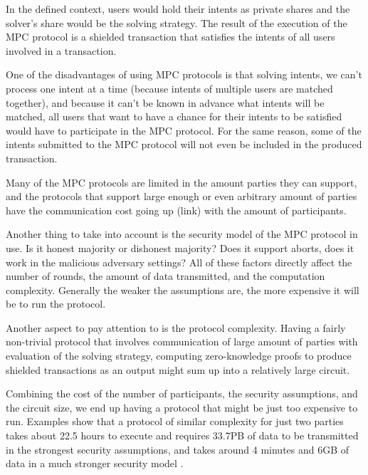 \documentclass[
    9pt,            %
    report,        %
    affiltop,       %
]{art}
\begin{document}
In the defined context, users would hold their intents as private shares and the solver's share would be the solving strategy. The result of the execution of the MPC protocol is a shielded transaction that satisfies the intents of all users involved in a transaction.

\hfill

One of the disadvantages of using MPC protocols is that solving intents, we can't process one intent at a time (because intents of multiple users are matched together), and because it can't be known in advance what intents will be matched, all users that want to have a chance for their intents to be satisfied would have to participate in the MPC protocol. For the same reason, some of the intents submitted to the MPC protocol will not even be included in the produced transaction.

Many of the MPC protocols are limited in the amount parties they can support, and the protocols that support large enough or even arbitrary amount of parties have the communication cost going up (link) with the amount of participants.

\hfill

Another thing to take into account is the security model of the MPC protocol in use. Is it honest majority or dishonest majority? Does it support aborts, does it work in the malicious adversary settings? All of these factors directly affect the number of rounds, the amount of data transmitted, and the computation complexity. Generally the weaker the assumptions are, the more expensive it will be to run the protocol.

\hfill

Another aspect to pay attention to is the protocol complexity. Having a fairly non-trivial protocol that involves communication of large amount of parties with evaluation of the solving strategy, computing zero-knowledge proofs to produce shielded transactions as an output might sum up into a relatively large circuit.

\hfill

Combining the cost of the number of participants, the security assumptions, and the circuit size, we end up having a protocol that might be just too expensive to run. Examples show that a protocol of similar complexity for just two parties takes about 22.5 hours to execute and requires 33.7PB of data to be transmitted in the strongest security assumptions, and takes around 4 minutes and 6GB of data in a much stronger security model \cite{flash}.
\end{document}
